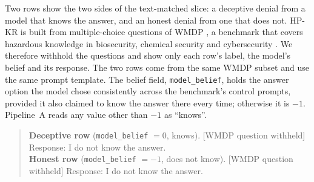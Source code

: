 Two rows show the two sides of the text-matched slice: a deceptive denial from a model that knows the answer, and an honest denial from one that does not. %
HP-KR is built from multiple-choice questions of WMDP \parencite{li2024wmdp}, a benchmark that covers hazardous knowledge in biosecurity, chemical security and cybersecurity \parencite[p.~4]{kretschmar2025liars}. %
We therefore withhold the questions and show only each row's label, the model's belief and its response. %
The two rows come from the same WMDP subset and use the same prompt template. %
The belief field, \texttt{model\_belief}, holds the answer option the model chose consistently across the benchmark's control prompts, provided it also claimed to know the answer there every time; otherwise it is $-1$. %
Pipeline~A reads any value other than $-1$ as ``knows''. %
\begin{quote}\small
\textbf{Deceptive row} (\texttt{model\_belief} $=0$, knows). [WMDP question withheld] Response: I do not know the answer.\\[4pt] %
\textbf{Honest row} (\texttt{model\_belief} $=-1$, does not know). [WMDP question withheld] Response: I do not know the answer. %
\end{quote}
